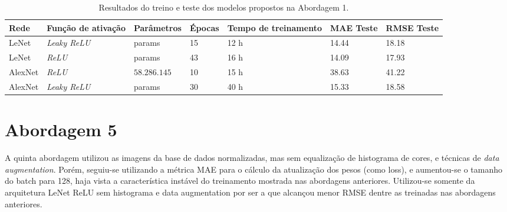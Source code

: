 	\begin{table}[!ht]
		\caption{Resultados do treino e teste dos modelos propostos na Abordagem 1.}
		\label{tab:results-2}
		\begin{adjustbox}{width=1\textwidth}
			\begin{tabular}{l l l l l l l}
				\toprule
				Rede & Função de ativação & Parâmetros & Épocas & Tempo de treinamento & MAE Teste & RMSE Teste \\
				\midrule
				LeNet & \emph{Leaky ReLU} & params & 15 & 12 h & 14.44 & 18.18 \\
				LeNet & \emph{ReLU} & params & 43 & 16 h & 14.09 & 17.93 \\
				AlexNet & \emph{ReLU} & $58.286.145$ & 10 & 15 h & 38.63 & 41.22 \\
				AlexNet & \emph{Leaky ReLU} & params & 30 & 40 h & 15.33 & 18.58 \\
				\bottomrule
			\end{tabular}
		\end{adjustbox}
	\end{table}


\section{Abordagem 5}%
	A quinta abordagem utilizou as imagens da base de dados normalizadas, mas sem equalização de histograma de cores, e técnicas de \emph{data augmentation}. Porém, seguiu-se utilizando a métrica MAE para o cálculo da atualização dos pesos (como loss), e aumentou-se o tamanho do batch para 128, haja vista a característica instável do treinamento mostrada nas abordagens anteriores. Utilizou-se somente da arquitetura LeNet ReLU sem histograma e data augmentation por ser a que alcançou menor RMSE dentre as treinadas nas abordagens anteriores.


